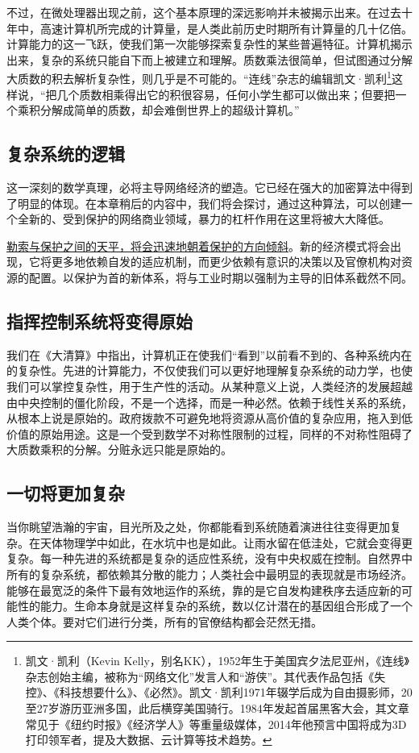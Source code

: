 不过，在微处理器出现之前，这个基本原理的深远影响并未被揭示出来。在过去十年中，高速计算机所完成的计算量，是人类此前历史时期所有计算量的几十亿倍。计算能力的这一飞跃，使我们第一次能够探索复杂性的某些普遍特征。计算机揭示出来，复杂的系统只能自下而上被建立和理解。质数乘法很简单，但试图通过分解大质数的积去解析复杂性，则几乎是不可能的。“连线”杂志的编辑凯文·凯利\footnote{凯文·凯利（Kevin Kelly，别名KK），1952年生于美国宾夕法尼亚州，《连线》杂志创始主编，被称为“网络文化”发言人和“游侠”。其代表作品包括《失控》、《科技想要什么》、《必然》。凯文·凯利1971年辍学后成为自由摄影师，20至27岁游历亚洲多国，此后横穿美国骑行。1984年发起首届黑客大会，其文章常见于《纽约时报》《经济学人》等重量级媒体，2014年他预言中国将成为3D打印领军者，提及大数据、云计算等技术趋势。}这样说，“把几个质数相乘得出它的积很容易，任何小学生都可以做出来；但要把一个乘积分解成简单的质数，却会难倒世界上的超级计算机。”

\subsection{复杂系统的逻辑}
这一深刻的数学真理，必将主导网络经济的塑造。它已经在强大的加密算法中得到了明显的体现。在本章稍后的内容中，我们将会探讨，通过这种算法，可以创建一个全新的、受到保护的网络商业领域，暴力的杠杆作用在这里将被大大降低。

\uline{勒索与保护之间的天平，将会迅速地朝着保护的方向倾斜}。新的经济模式将会出现，它将更多地依赖自发的适应机制，而更少依赖有意识的决策以及官僚机构对资源的配置。以保护为首的新体系，将与工业时期以强制为主导的旧体系截然不同。

\subsection{指挥控制系统将变得原始}
我们在《大清算》中指出，计算机正在使我们“看到”以前看不到的、各种系统内在的复杂性。先进的计算能力，不仅使我们可以更好地理解复杂系统的动力学，也使我们可以掌控复杂性，用于生产性的活动。从某种意义上说，人类经济的发展超越由中央控制的僵化阶段，不是一个选择，而是一种必然。依赖于线性关系的系统，从根本上说是原始的。政府拨款不可避免地将资源从高价值的复杂应用，拖入到低价值的原始用途。这是一个受到数学不对称性限制的过程，同样的不对称性阻碍了大质数乘积的分解。分赃永远只能是原始的。

\subsection{一切将更加复杂}
当你眺望浩瀚的宇宙，目光所及之处，你都能看到系统随着演进往往变得更加复杂。在天体物理学中如此，在水坑中也是如此。让雨水留在低洼处，它就会变得更复杂。每一种先进的系统都是复杂的适应性系统，没有中央权威在控制。自然界中所有的复杂系统，都依赖其分散的能力；人类社会中最明显的表现就是市场经济。能够在最宽泛的条件下最有效地运作的系统，靠的是它自发构建秩序去适应新的可能性的能力。生命本身就是这样复杂的系统，数以亿计潜在的基因组合形成了一个人类个体。要对它们进行分类，所有的官僚结构都会茫然无措。

